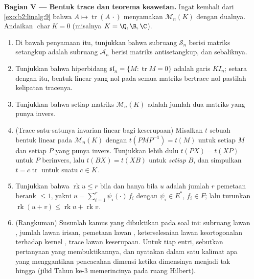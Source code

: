 \begin{problem}
\medskip
\noindent\textbf{Bagian V --- Bentuk trace dan teorema
keawetan.} Ingat kembali dari \cref{exo:b2:linalg:9} bahwa $A \mapsto
\operatorname{tr}(A\,\cdot)$ menyamakan $\mathcal{M}_n(K)$ dengan
dualnya. Andaikan $\operatorname{char} K = 0$ (misalnya $K = \Q, \R,
\C$).
\begin{enumerate}[resume]
  \item Di bawah penyamaan itu, tunjukkan bahwa 
        subruang $\mathcal{S}_n$ berisi matriks setangkup adalah
        subruang $\mathcal{A}_n$ berisi matriks antisetangkup, dan
        sebaliknya.
  \item Tunjukkan bahwa  hiperbidang
        $\mathfrak{sl}_n = \{M : \operatorname{tr} M = 0\}$ adalah
        garis $K I_n$; setara dengan itu, bentuk linear yang nol
        pada semua matriks bertrace nol pastilah kelipatan tracenya.
  \item Tunjukkan bahwa setiap matriks $\mathcal{M}_n(K)$ adalah jumlah
        dua matriks yang punya invers.
  \item (Trace satu-satunya invarian linear bagi keserupaan) Misalkan
        $t$ sebuah bentuk linear pada $\mathcal{M}_n(K)$ dengan
        $t(PMP^{-1}) = t(M)$ untuk setiap $M$ dan setiap $P$ yang
        punya invers. Tunjukkan lebih dulu $t(PX) = t(XP)$ untuk $P$
        berinvers, lalu $t(BX) = t(XB)$ untuk \emph{setiap} $B$, dan
        simpulkan $t = c \operatorname{tr}$ untuk suatu $c \in K$.
  \item Tunjukkan bahwa $\operatorname{rk} u \leq r$ bila dan hanya bila
        $u$ adalah jumlah $r$ pemetaan berank $\leq 1$, yakni $u =
        \sum_{i=1}^{r} \psi_i(\cdot)\,f_i$ dengan $\psi_i \in E^*$,
        $f_i \in F$; lalu turunkan $\operatorname{rk}(u + v) \leq
        \operatorname{rk} u + \operatorname{rk} v$.
  \item (Rangkuman) Susunlah kamus yang dibuktikan pada soal
        ini: subruang lawan , jumlah lawan
        irisan, pemetaan lawan , keterselesaian lawan
        keortogonalan terhadap kernel , trace lawan
        keserupaan. Untuk tiap entri, sebutkan pertanyaan yang
        membuktikannya, dan nyatakan dalam satu kalimat apa yang
        menggantikan pencacahan dimensi ketika dimensinya menjadi tak
        hingga (jilid Tahun ke-3 memerincinya pada ruang Hilbert).

\end{enumerate}
\end{problem}
